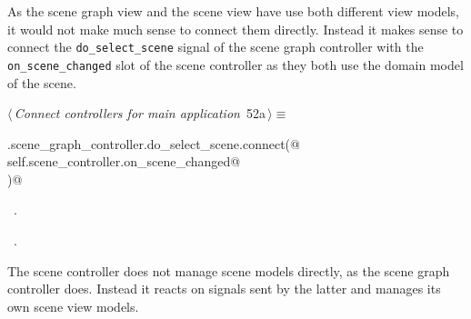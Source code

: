 \documentclass[
    a4paper,      %
    10pt,         %
    openright,    %
    notitlepage,  %
    parskip=half, %
]{scrreprt}       %
\theoremstyle{definition}                    %
\begin{document}
As the scene graph view and the scene view have use both different view models,
it would not make much sense to connect them directly. Instead it makes sense to
connect the \verb+do_select_scene+ signal of the scene graph controller with the
\verb+on_scene_changed+ slot of the scene controller as they both use the
domain model of the scene.

\begin{flushleft} \small
\begin{minipage}{\linewidth}\label{scrap76}\raggedright\small
{} $\langle\,${\itshape Connect controllers for main application}\nobreak\ {\footnotesize {52a}}$\,\rangle\equiv$
\vspace{-1exm}
\begin{list}{}{} \item
\mbox{}\lstinline@self.scene_graph_controller.do_select_scene.connect(@\\
\mbox{}\lstinline@    self.scene_controller.on_scene_changed@\\
\mbox{}\lstinline@)@{\NWsep}
\end{list}
\vspace{-1.5ex}
\footnotesize
\begin{list}{}{\setlength{\itemsep}{-\parsep}\setlength{\itemindent}{-\leftmargin}}
\item \NWtxtMacroDefBy\ .
\item \NWtxtMacroRefIn\ .

\item{}
\end{list}
\end{minipage}\vspace{4ex}
\end{flushleft}
The scene controller does not manage scene models directly, as the scene graph
controller does. Instead it reacts on signals sent by the latter and manages
its own scene view models.
\end{document}
